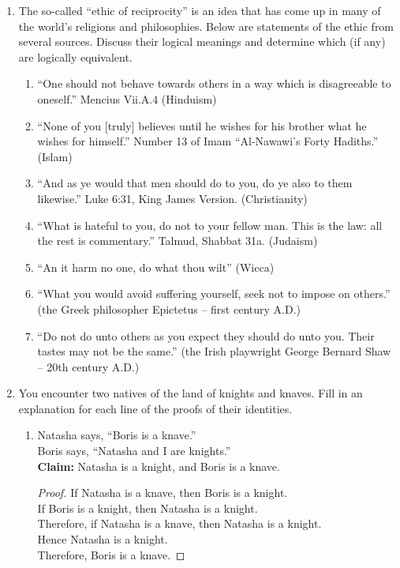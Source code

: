 \begin{enumerate}
\newpage

\item The so-called ``ethic of reciprocity'' is an idea that has come 
up in many of the world's religions and philosophies.  
Below are statements of the ethic
from several sources.  Discuss their logical meanings and determine which (if 
any) are logically equivalent.

\begin{enumerate}
\item ``One should not behave towards others in a way which is disagreeable to oneself.'' Mencius Vii.A.4 (Hinduism)
\item ``None of you [truly] believes until he wishes for his brother what he wishes for himself.'' Number 13 of Imam ``Al-Nawawi's Forty Hadiths.'' (Islam)
\item ``And as ye would that men should do to you, do ye also to them likewise.'' Luke 6:31, King James Version. (Christianity)
\item ``What is hateful to you, do not to your fellow man. This is the law: all the rest is commentary.'' Talmud, Shabbat 31a. (Judaism)
\item ``An it harm no one, do what thou wilt'' (Wicca)
\item ``What you would avoid suffering yourself, seek not to impose on others.'' (the Greek philosopher Epictetus -- first century A.D.)
\item ``Do not do unto others as you expect they should do unto you. Their tastes may not be the same.'' (the Irish playwright George Bernard Shaw -- 20th century A.D.)
\end{enumerate}

\item You encounter two natives of the land of knights and knaves. Fill
in an explanation for each line of the proofs of their identities. 

\begin{enumerate}
\item Natasha says, ``Boris is a knave.'' \\
Boris says, ``Natasha and I are knights.''\\

\textbf{Claim:} Natasha is a knight, and Boris is a knave.\\

\begin{proof} If Natasha is a knave, then Boris is a knight.\\
If Boris is a knight, then Natasha is a knight.\\
Therefore, if Natasha is a knave, then Natasha is a knight.\\
Hence Natasha is a knight.\\
Therefore, Boris is a knave.
\end{proof}


\end{enumerate}
\end{enumerate}
